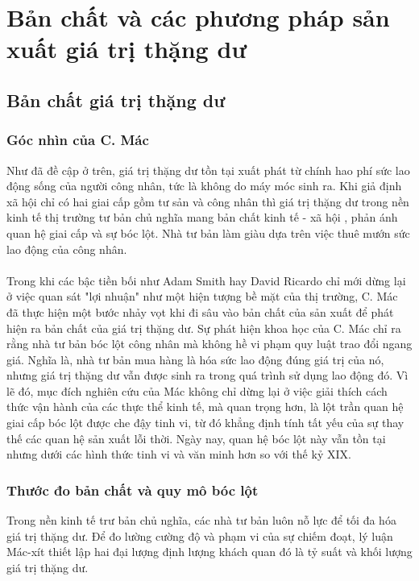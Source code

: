 \section{Bản chất và các phương pháp sản xuất giá trị thặng dư}

\subsection{Bản chất giá trị thặng dư}

\subsubsection{Góc nhìn của C. Mác}

Như đã đề cập ở trên, giá trị thặng dư tồn tại xuất phát từ chính hao phí sức lao động sống của người công nhân, tức là không do máy móc sinh ra. Khi giả định xã hội chỉ có hai giai cấp gồm tư sản và công nhân thì giá trị thặng dư trong nền kinh tế thị trường tư bản chủ nghĩa mang bản chất kinh tế - xã hội \cite[trang 89]{gt}, phản ánh quan hệ giai cấp và sự bóc lột. Nhà tư bản làm giàu dựa trên việc thuê mướn sức lao động của công nhân.\\\\
Trong khi các bậc tiền bối như Adam Smith hay David Ricardo chỉ mới dừng lại ở việc quan sát "lợi nhuận" như một hiện tượng bề mặt của thị trường, C. Mác đã thực hiện một bước nhảy vọt khi đi sâu vào bản chất của sản xuất để phát hiện ra bản chất của giá trị thặng dư. Sự phát hiện khoa học của C. Mác chỉ ra rằng nhà tư bản bóc lột công nhân mà không hề vi phạm quy luật trao đổi ngang giá. Nghĩa là, nhà tư bản mua hàng là hóa sức lao động đúng giá trị của nó, nhưng giá trị thặng dư vẫn được sinh ra trong quá trình sử dụng lao động đó. Vì lẽ đó, mục đích nghiên cứu của Mác không chỉ dừng lại ở việc giải thích cách thức vận hành của các thực thể kinh tế, mà quan trọng hơn, là lột trần quan hệ giai cấp bóc lột được che đậy tinh vi, từ đó khẳng định tính tất yếu của sự thay thế các quan hệ sản xuất lỗi thời. Ngày nay, quan hệ bóc lột này vẫn tồn tại nhưng dưới các hình thức tinh vi và văn minh hơn so với thế kỷ XIX.

\subsubsection{Thước đo bản chất và quy mô bóc lột}

Trong nền kinh tế trư bản chủ nghĩa, các nhà tư bản luôn nỗ lực để tối đa hóa giá trị thặng dư. Để đo lường cường độ và phạm vi của sự chiếm đoạt, lý luận Mác-xít thiết lập hai đại lượng định lượng khách quan đó là tỷ suất và khối lượng giá trị thặng dư.\\

